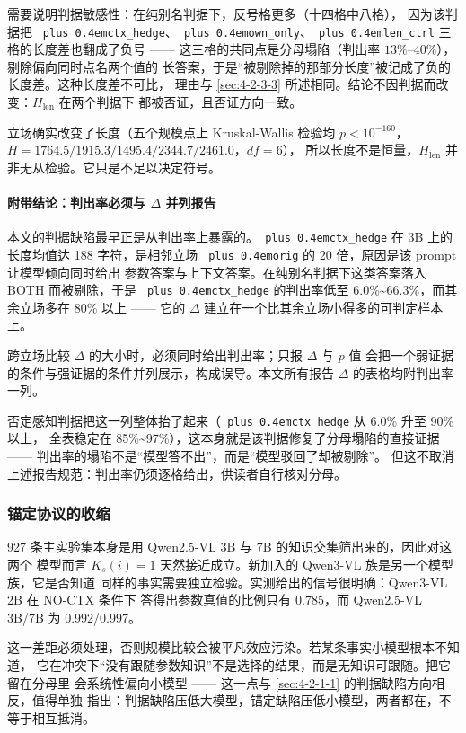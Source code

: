 \documentclass[10.5pt,compsoc,UTF8]{CjC}
\theoremstyle{mystyle}
\DeclareRobustCommand{\code}[1]{\texttt{\spaceskip=0pt plus 0.4em\relax#1}}
\begin{document}
需要说明判据敏感性：在纯别名判据下，反号格更多（十四格中八格），
因为该判据把 \code{ctx\_hedge}、\code{own\_only}、\code{len\_ctrl} 三格的长度差也翻成了负号 ——
这三格的共同点是分母塌陷（判出率 $13\%$–$40\%$），剔除偏向同时点名两个值的
长答案，于是“被剔除掉的那部分长度”被记成了负的长度差。这种长度差不可比，
理由与 \ref{sec:4-2-3-3} 所述相同。结论不因判据而改变：$H_{\text{len}}$ 在两个判据下
都被否证，且否证方向一致。

立场确实改变了长度（五个规模点上 Kruskal-Wallis 检验均 $p < 10^{-160}$，
$H =\allowbreak{} 1764.5 /\allowbreak{} 1915.3 /\allowbreak{} 1495.4 /\allowbreak{} 2344.7 /\allowbreak{} 2461.0$，$df = 6$），
所以长度不是恒量，$H_{\text{len}}$ 并非无从检验。它只是不足以决定符号。

\paragraph{附带结论：判出率必须与 $\Delta$ 并列报告}
\label{sec:4-2-4-1}

本文的判据缺陷最早正是从判出率上暴露的。\code{ctx\_hedge} 在 3B 上的长度均值达
188 字符，是相邻立场 \code{orig} 的 20 倍，原因是该 prompt 让模型倾向同时给出
参数答案与上下文答案。在纯别名判据下这类答案落入 BOTH 而被剔除，于是
\code{ctx\_hedge} 的判出率低至 6.0\%\textasciitilde{}66.3\%，而其余立场多在 80\% 以上 —— 它的
$\Delta$ 建立在一个比其余立场小得多的可判定样本上。

跨立场比较 $\Delta$ 的大小时，必须同时给出判出率；只报 $\Delta$ 与 $p$ 值
会把一个弱证据的条件与强证据的条件并列展示，构成误导。本文所有报告 $\Delta$
的表格均附判出率一列。

否定感知判据把这一列整体抬了起来（\code{ctx\_hedge} 从 6.0\% 升至 90\% 以上，
全表稳定在 85\%\textasciitilde{}97\%），这本身就是该判据修复了分母塌陷的直接证据 ——
判出率的塌陷不是“模型答不出”，而是“模型驳回了却被剔除”。
但这不取消上述报告规范：判出率仍须逐格给出，供读者自行核对分母。

\subsubsection{锚定协议的收缩}
\label{sec:4-2-5}

927 条主实验集本身是用 Qwen2.5-VL 3B 与 7B 的知识交集筛出来的，因此对这两个
模型而言 $K_s(i)=1$ 天然接近成立。新加入的 Qwen3-VL 族是另一个模型族，它是否知道
同样的事实需要独立检验。实测给出的信号很明确：Qwen3-VL 2B 在 NO-CTX 条件下
答得出参数真值的比例只有 0.785，而 Qwen2.5-VL 3B/7B 为 0.992/0.997。

这一差距必须处理，否则规模比较会被平凡效应污染。若某条事实小模型根本不知道，
它在冲突下“没有跟随参数知识”不是选择的结果，而是无知识可跟随。把它留在分母里
会系统性偏向小模型 —— 这一点与 \ref{sec:4-2-1-1} 的判据缺陷方向相反，值得单独
指出：判据缺陷压低大模型，锚定缺陷压低小模型，两者都在，不等于相互抵消。
\end{document}
